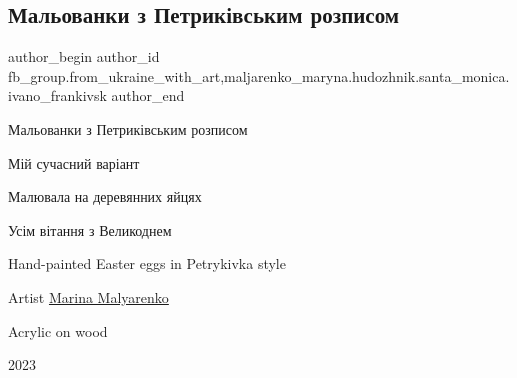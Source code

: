  
 
 
 
 

\subsection{Мальованки з Петриківським розписом}
\label{sec:14_04_2023.fb.fb_group.from_ukraine_with_art.1.maljovanky_petrykivka_rozpys_velykden}
 
\ifcmt
 author_begin
   author_id fb_group.from_ukraine_with_art,maljarenko_maryna.hudozhnik.santa_monica.ivano_frankivsk
 author_end
\fi

Мальованки з Петриківським розписом

Мій сучасний варіант

Малювала на деревянних яйцях

Усім вітання з Великоднем💙💛

Hand-painted Easter eggs in Petrykivka style 

Artist \href{https://www.facebook.com/malyarinka}{Marina Malyarenko}

Acrylic on wood 

2023

